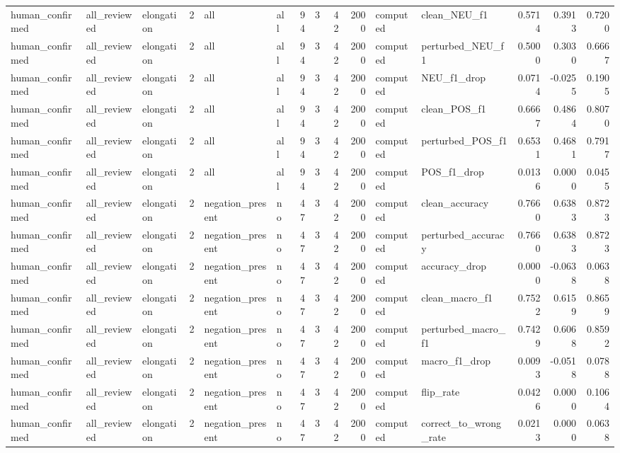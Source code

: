 \begin{tabular}{lllrllrrrrllrrr}
human_confirmed & all_reviewed & elongation & 2 & all & all & 94 & 3 & 42 & 2000 & computed & clean_NEU_f1 & 0.5714 & 0.3913 & 0.7200 \\
human_confirmed & all_reviewed & elongation & 2 & all & all & 94 & 3 & 42 & 2000 & computed & perturbed_NEU_f1 & 0.5000 & 0.3030 & 0.6667 \\
human_confirmed & all_reviewed & elongation & 2 & all & all & 94 & 3 & 42 & 2000 & computed & NEU_f1_drop & 0.0714 & -0.0255 & 0.1905 \\
human_confirmed & all_reviewed & elongation & 2 & all & all & 94 & 3 & 42 & 2000 & computed & clean_POS_f1 & 0.6667 & 0.4864 & 0.8070 \\
human_confirmed & all_reviewed & elongation & 2 & all & all & 94 & 3 & 42 & 2000 & computed & perturbed_POS_f1 & 0.6531 & 0.4681 & 0.7917 \\
human_confirmed & all_reviewed & elongation & 2 & all & all & 94 & 3 & 42 & 2000 & computed & POS_f1_drop & 0.0136 & 0.0000 & 0.0455 \\
human_confirmed & all_reviewed & elongation & 2 & negation_present & no & 47 & 3 & 42 & 2000 & computed & clean_accuracy & 0.7660 & 0.6383 & 0.8723 \\
human_confirmed & all_reviewed & elongation & 2 & negation_present & no & 47 & 3 & 42 & 2000 & computed & perturbed_accuracy & 0.7660 & 0.6383 & 0.8723 \\
human_confirmed & all_reviewed & elongation & 2 & negation_present & no & 47 & 3 & 42 & 2000 & computed & accuracy_drop & 0.0000 & -0.0638 & 0.0638 \\
human_confirmed & all_reviewed & elongation & 2 & negation_present & no & 47 & 3 & 42 & 2000 & computed & clean_macro_f1 & 0.7522 & 0.6159 & 0.8659 \\
human_confirmed & all_reviewed & elongation & 2 & negation_present & no & 47 & 3 & 42 & 2000 & computed & perturbed_macro_f1 & 0.7429 & 0.6068 & 0.8592 \\
human_confirmed & all_reviewed & elongation & 2 & negation_present & no & 47 & 3 & 42 & 2000 & computed & macro_f1_drop & 0.0093 & -0.0518 & 0.0788 \\
human_confirmed & all_reviewed & elongation & 2 & negation_present & no & 47 & 3 & 42 & 2000 & computed & flip_rate & 0.0426 & 0.0000 & 0.1064 \\
human_confirmed & all_reviewed & elongation & 2 & negation_present & no & 47 & 3 & 42 & 2000 & computed & correct_to_wrong_rate & 0.0213 & 0.0000 & 0.0638 \\

\end{tabular}
